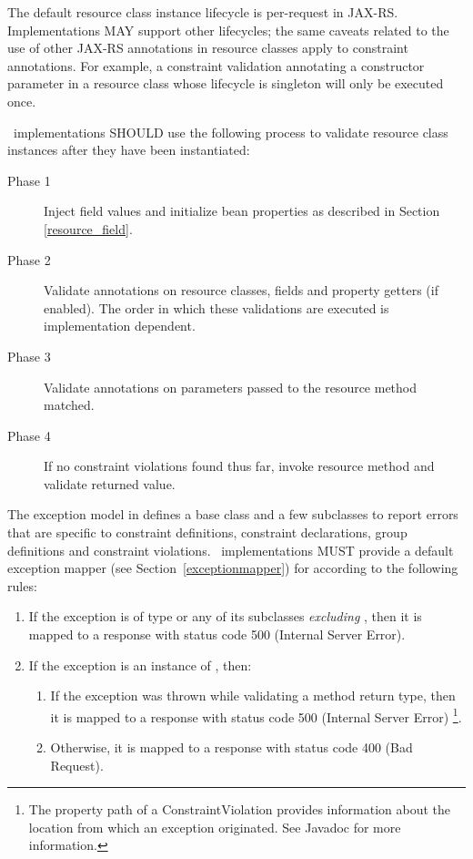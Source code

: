 The default resource class instance lifecycle is per-request in JAX-RS. Implementations MAY support other lifecycles; the same caveats related to the use of other JAX-RS annotations in resource classes apply to constraint annotations. For example, a constraint validation annotating a constructor parameter in a resource class whose lifecycle is singleton will only be executed once.

\jaxrs\ implementations SHOULD use the following process to validate resource class instances after they have been instantiated:

\begin{description}
\item[Phase 1] Inject field values and initialize bean properties as described in Section \ref{resource_field}.
\item[Phase 2] Validate annotations on resource classes, fields and property getters (if enabled). The order in which these validations are executed is implementation dependent.
\item[Phase 3] Validate annotations on parameters passed to the resource method matched. 
\item[Phase 4] If no constraint violations found thus far, invoke resource method and validate returned value. 
\end{description}

The exception model in \cite{bv11} defines a base class  and a few subclasses to report errors that are specific to constraint definitions, constraint declarations, group definitions and constraint violations. \jaxrs\ implementations MUST provide a default exception mapper (see Section~\ref{exceptionmapper}) for  according to the following rules:

\begin{enumerate}
\item If the exception is of type  or any of its subclasses {\em excluding} , then it is mapped to a response with status code 500 (Internal Server Error).
\item If the exception is an instance of , then:
\begin{enumerate}
\item If the exception was thrown while validating a method return type, then it is mapped to a response with status code 500 (Internal Server Error) \footnote{The property path of a {\code ConstraintViolation} provides information about the location from which an exception originated. See Javadoc for more information.}.
\item Otherwise, it is mapped to a response with status code 400 (Bad Request). 
\end{enumerate}
\end{enumerate}

